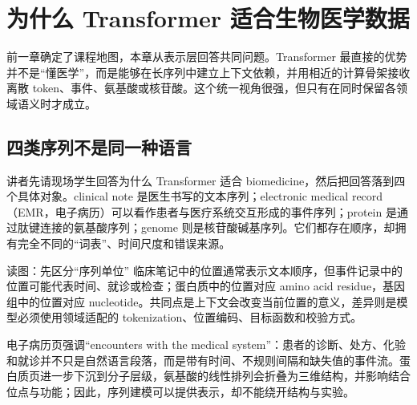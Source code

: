 \section{为什么 Transformer 适合生物医学数据}

前一章确定了课程地图，本章从表示层回答共同问题。Transformer 最直接的优势并不是“懂医学”，而是能够在长序列中建立上下文依赖，并用相近的计算骨架接收离散 token、事件、氨基酸或核苷酸。这个统一视角很强，但只有在同时保留各领域语义时才成立。

\subsection{四类序列不是同一种语言}

讲者先请现场学生回答为什么 Transformer 适合 biomedicine，然后把回答落到四个具体对象。clinical note 是医生书写的文本序列；electronic medical record（EMR，电子病历）可以看作患者与医疗系统交互形成的事件序列；protein 是通过肽键连接的氨基酸序列；genome 则是核苷酸碱基序列。它们都存在顺序，却拥有完全不同的“词表”、时间尺度和错误来源。



\begin{knowledgebox}{读图：先区分“序列单位”}
临床笔记中的位置通常表示文本顺序，但事件记录中的位置可能代表时间、就诊或检查；蛋白质中的位置对应 amino acid residue，基因组中的位置对应 nucleotide。共同点是上下文会改变当前位置的意义，差异则是模型必须使用领域适配的 tokenization、位置编码、目标函数和校验方式。
\end{knowledgebox}

电子病历页强调“encounters with the medical system”：患者的诊断、处方、化验和就诊并不只是自然语言段落，而是带有时间、不规则间隔和缺失值的事件流。蛋白质页进一步下沉到分子层级，氨基酸的线性排列会折叠为三维结构，并影响结合位点与功能；因此，序列建模可以提供表示，却不能绕开结构与实验。



